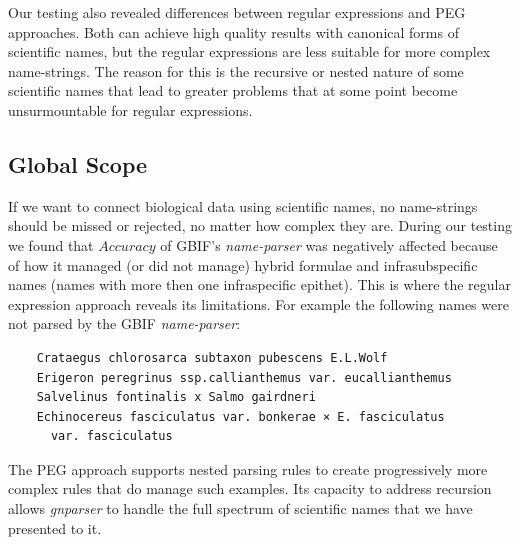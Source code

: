 \documentclass{bmcart}
\begin{document}
Our testing also revealed differences between regular expressions and PEG
approaches. Both can achieve high quality results with canonical forms of scientific names, but the
regular expressions are less suitable for more complex name-strings. The reason for this is the recursive or nested nature of some scientific names that lead to greater
problems that at some point become unsurmountable for regular expressions.

\subsection*{Global Scope}

If we want to connect biological data using scientific names, no name-strings
should be missed or rejected, no matter how complex they are. During our
testing we found that $Accuracy$ of GBIF's \textit{name-parser} was negatively
affected because of how it managed (or did not manage) hybrid formulae and infrasubspecific names (names
with more then one infraspecific epithet). This is where the regular expression approach reveals its limitations.  For example the following names were not parsed by the GBIF \textit{name-parser}:

\vspace{0.5cm}

\begin{verbatim}
    Crataegus chlorosarca subtaxon pubescens E.L.Wolf
    Erigeron peregrinus ssp.callianthemus var. eucallianthemus
    Salvelinus fontinalis x Salmo gairdneri
    Echinocereus fasciculatus var. bonkerae × E. fasciculatus
      var. fasciculatus
\end{verbatim}

\vspace{0.5cm}

The PEG approach supports nested parsing rules to create progressively more complex rules that do manage such examples. Its capacity to address
recursion allows \textit{gnparser} to handle the full spectrum of scientific names that we have presented to it.
\end{document}
